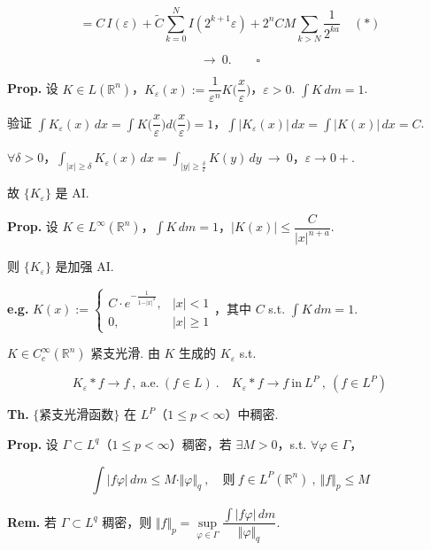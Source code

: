 \documentclass[11pt]{ctexart}
\theoremstyle{definition}
\begin{document}
\[
= C\, I(\varepsilon) + \widetilde{C} \sum_{k=0}^{N} I(2^{k+1}\varepsilon) + 2^n C M \sum_{k > N} \frac{1}{2^{ka}} \quad (\ast)
\]

\[
\to\ 0. \qquad \square
\]

\textbf{Prop.} 设 $K \in L(\mathbb{R}^n)$，$K_\varepsilon(x) := \dfrac{1}{\varepsilon^n} K\Big( \dfrac{x}{\varepsilon} \Big)$，$\varepsilon > 0$. $\displaystyle\int K \, dm = 1$.

验证 $\displaystyle\int K_\varepsilon(x)\, dx = \int K\Big(\dfrac{x}{\varepsilon}\Big) d\Big(\dfrac{x}{\varepsilon}\Big) = 1$，$\displaystyle\int \vert K_\varepsilon(x)\vert \, dx = \int \vert K(x)\vert \, dx = C$.

$\forall \delta > 0$，$\displaystyle\int_{\vert x\vert \geq \delta} K_\varepsilon(x)\, dx = \int_{\vert y\vert \geq \frac{\delta}{\varepsilon}} K(y)\, dy \ \to\ 0$，$\varepsilon \to 0+$.

故 $\{K_\varepsilon\}$ 是 AI.

\textbf{Prop.} 设 $K \in L^\infty(\mathbb{R}^n)$，$\displaystyle\int K \, dm = 1$，$\vert K(x)\vert \leq \dfrac{C}{\vert x\vert^{n+a}}$.

则 $\{K_\varepsilon\}$ 是加强 AI.

\textbf{e.g.} $K(x) := \begin{cases} C \cdot e^{-\frac{1}{1 - \vert x\vert^2}}, & \vert x\vert < 1 \\ 0, & \vert x\vert \geq 1 \end{cases}$，其中 $C$ s.t. $\displaystyle\int K \, dm = 1$.

$K \in C_c^{\infty}(\mathbb{R}^n)$ 紧支光滑. 由 $K$ 生成的 $K_\varepsilon$ s.t.

\[
K_\varepsilon \ast f \to f \ ,\ \text{a.e.}\ (f \in L) \ .\quad K_\varepsilon \ast f \to f\ \text{in}\ L^P \ ,\ (f \in L^P)
\]

\textbf{Th.} $\{$紧支光滑函数$\}$ 在 $L^P$（$1 \leq p < \infty$）中稠密.

\textbf{Prop.} 设 $\Gamma \subset L^q$（$1 \leq p < \infty$）稠密，若 $\exists M > 0$，s.t. $\forall \varphi \in \Gamma$，

\[
\int \vert f \varphi\vert \, dm \leq M \cdot \Vert \varphi\Vert_q \ ,\quad \text{则}\ f \in L^P(\mathbb{R}^n) \ ,\ \Vert f\Vert_p \leq M
\]

\textbf{Rem.} 若 $\Gamma \subset L^q$ 稠密，则 $\Vert f\Vert_p = \sup\limits_{\varphi \in \Gamma} \dfrac{\int \vert f \varphi\vert \, dm}{\Vert \varphi\Vert_q}$.
\end{document}
